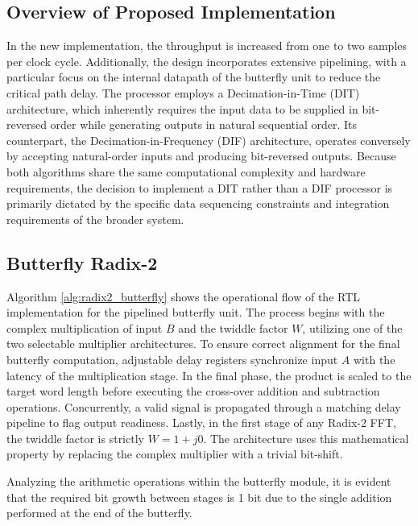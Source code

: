\subsection{Overview of Proposed Implementation}
In the new implementation, the throughput is increased from one to two samples per clock cycle. Additionally, the design incorporates extensive pipelining, with a particular focus on the internal datapath of the butterfly unit to reduce the critical path delay. The processor employs a Decimation-in-Time (DIT) architecture, which inherently requires the input data to be supplied in bit-reversed order while generating outputs in natural sequential order. Its counterpart, the Decimation-in-Frequency (DIF) architecture, operates conversely by accepting natural-order inputs and producing bit-reversed outputs. Because both algorithms share the same computational complexity and hardware requirements, the decision to implement a DIT rather than a DIF processor is primarily dictated by the specific data sequencing constraints and integration requirements of the broader system.

\subsection{Butterfly Radix-2}

Algorithm \ref{alg:radix2_butterfly} shows the operational flow of the RTL implementation for the pipelined butterfly unit. The process begins with the complex multiplication of input $B$ and the twiddle factor $W$, utilizing one of the two selectable multiplier architectures. To ensure correct alignment for the final butterfly computation, adjustable delay registers synchronize input $A$ with the latency of the multiplication stage. In the final phase, the product is scaled to the target word length before executing the cross-over addition and subtraction operations. Concurrently, a valid signal is propagated through a matching delay pipeline to flag output readiness. Lastly, in the first stage of any Radix-2 FFT, the twiddle factor is strictly $W = 1 + j0$. The architecture uses this mathematical property by replacing the complex multiplier with a trivial bit-shift.

Analyzing the arithmetic operations within the butterfly module, it is evident that the required bit growth between stages is 1 bit due to the single addition performed at the end of the butterfly.


